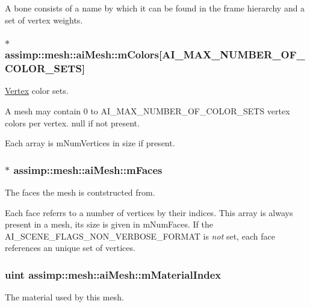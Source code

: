 A bone consists of a name by which it can be found in the frame hierarchy and a set of vertex weights. \hypertarget{structassimp_1_1mesh_1_1ai_mesh_a66060363bc944adb352801b977b3a102}{
\subsubsection[{m\+Colors}]{$\ast$ assimp\+::mesh\+::ai\+Mesh\+::m\+Colors\mbox{[}{\bf A\+I\+\_\+\+M\+A\+X\+\_\+\+N\+U\+M\+B\+E\+R\+\_\+\+O\+F\+\_\+\+C\+O\+L\+O\+R\+\_\+\+S\+E\+T\+S}\mbox{]}}}\label{structassimp_1_1mesh_1_1ai_mesh_a66060363bc944adb352801b977b3a102}
\hyperlink{struct_vertex}{Vertex} color sets.

A mesh may contain 0 to {\ttfamily A\+I\+\_\+\+M\+A\+X\+\_\+\+N\+U\+M\+B\+E\+R\+\_\+\+O\+F\+\_\+\+C\+O\+L\+O\+R\+\_\+\+S\+E\+T\+S} vertex colors per vertex. null if not present.

Each array is {\ttfamily m\+Num\+Vertices} in size if present. \hypertarget{structassimp_1_1mesh_1_1ai_mesh_a522ce4afe9b6e0d0b5df209e620b76ba}{
\subsubsection[{m\+Faces}]{$\ast$ assimp\+::mesh\+::ai\+Mesh\+::m\+Faces}}\label{structassimp_1_1mesh_1_1ai_mesh_a522ce4afe9b6e0d0b5df209e620b76ba}
The faces the mesh is contstructed from.

Each face referrs to a number of vertices by their indices. This array is always present in a mesh, its size is given in {\ttfamily m\+Num\+Faces}. If the {\ttfamily A\+I\+\_\+\+S\+C\+E\+N\+E\+\_\+\+F\+L\+A\+G\+S\+\_\+\+N\+O\+N\+\_\+\+V\+E\+R\+B\+O\+S\+E\+\_\+\+F\+O\+R\+M\+A\+T} is {\itshape not} set, each face references an unique set of vertices. \hypertarget{structassimp_1_1mesh_1_1ai_mesh_ac5ac01d7d9c915de71c2c80338db9901}{
\subsubsection[{m\+Material\+Index}]{\setlength{\rightskip}{0pt plus 5cm}uint assimp\+::mesh\+::ai\+Mesh\+::m\+Material\+Index}}\label{structassimp_1_1mesh_1_1ai_mesh_ac5ac01d7d9c915de71c2c80338db9901}
The material used by this mesh.

